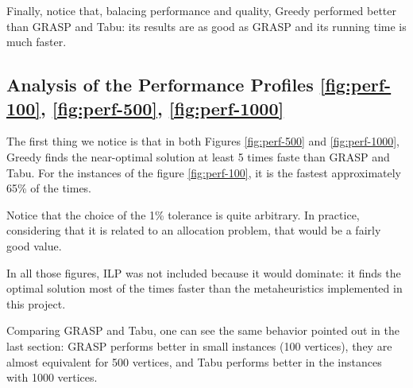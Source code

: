 Finally, notice that, balacing performance and quality, Greedy performed better than GRASP and Tabu: its results are as good as GRASP and its running time is much faster.

\subsection{Analysis of the Performance Profiles \ref{fig:perf-100}, \ref{fig:perf-500}, \ref{fig:perf-1000}}

The first thing we notice is that in both Figures \ref{fig:perf-500} and \ref{fig:perf-1000}, Greedy finds the near-optimal solution at least 5 times faste than GRASP and Tabu. For the instances of the figure \ref{fig:perf-100}, it is the fastest approximately 65\% of the times.

Notice that the choice of the 1\% tolerance is quite arbitrary. In practice, considering that it is related to an allocation problem, that would be a fairly good value.

In all those figures, ILP was not included because it would dominate: it finds the optimal solution most of the times faster than the metaheuristics implemented in this project.

Comparing GRASP and Tabu, one can see the same behavior pointed out in the last section: GRASP performs better in small instances (100 vertices), they are almost equivalent for 500 vertices, and Tabu performs better in the instances with 1000 vertices.
